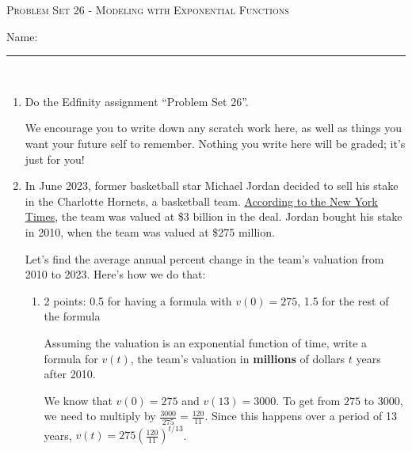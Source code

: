 \documentclass{article}
\makeatletter
\let\@href=\href
\renewcommand{\href}[2]{\@href{#1}{\ul{#2}}}
\newcommand{\doedfinity}[2][\newpage]{
  \begin{problem}[#1]
    Do the Edfinity assignment ``Problem Set #2''.

    We encourage you to write down any scratch work here, as well as
    things you want your future self to remember. Nothing you write
    here will be graded; it's just for you!
  \end{problem}
}
\makeatother
\begin{document}
\begin{center}
  \large\textsc{Problem Set 26 - Modeling with Exponential Functions}\vspace{.5in}\\
  \begin{problemonly}
   \large Name: \rule{5cm}{0.15mm}\\
   \end{problemonly}
\end{center}

\begin{enumerate}
\item  {}

  \doedfinity{26}

\item 

  In June 2023, former basketball star Michael Jordan decided to sell his stake in the Charlotte Hornets, a basketball team. \href{https://www.nytimes.com/2023/06/16/sports/basketball/michael-jordan-charlotte-hornets-sale.html?unlocked_article_code=1.WE4.efbp.a6g0fLAio0T-&smid=url-share}{According to the New York Times}, the team was valued at \$3 billion in the deal. Jordan bought his stake in 2010, when the team was valued at \$275 million.

  Let's find the average annual percent change in the team's valuation from 2010 to 2023. Here's how we do that:
  \begin{enumerate}
  \item

    \begin{grading}
      2 points: 0.5 for having a formula with $v(0) = 275$, 1.5 for the rest of the formula
    \end{grading}

    \begin{problem}[\vfill]
      Assuming the valuation is an exponential function of time, write a formula for $v(t)$, the team's valuation in \textbf{millions} of dollars $t$ years after 2010. 
    \end{problem}

    \begin{solution}
      We know that $v(0)=275$ and $v(13)=3000$. To get from $275$ to $3000$, we need
      to multiply by $\frac{3000}{275}=\frac{120}{11}$. Since this happens over a period
      of 13 years, $v(t) = 275\left(\frac{120}{11}\right)^{t/13}$.
    \end{solution}


\end{enumerate}
\end{enumerate}
\end{document}
